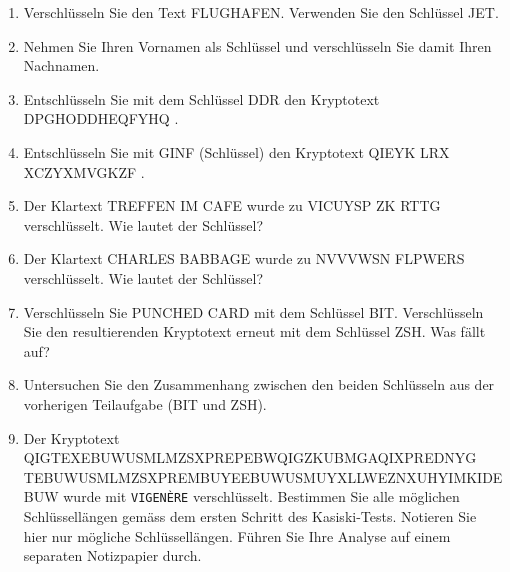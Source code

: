 \begin{enumerate}
\item Verschlüsseln Sie den Text FLUGHAFEN. Verwenden Sie den Schlüssel JET.

\fillwithgrid{0.75in}

\item Nehmen Sie Ihren Vornamen als Schlüssel und verschlüsseln Sie damit Ihren Nachnamen.

\fillwithgrid{0.75in}

\item Entschlüsseln Sie mit dem Schlüssel DDR den Kryptotext DPGHODDHEQFYHQ .


\fillwithgrid{1in}

\item Entschlüsseln Sie mit GINF (Schlüssel) den Kryptotext QIEYK LRX XCZYXMVGKZF .


\fillwithgrid{1in}

\item Der Klartext TREFFEN IM CAFE wurde zu VICUYSP ZK RTTG verschlüsselt. Wie lautet der Schlüssel?


\fillwithgrid{1in}

\item Der Klartext CHARLES BABBAGE wurde zu NVVVWSN FLPWERS verschlüsselt. Wie lautet der Schlüssel?



\newpage

\item Verschlüsseln Sie PUNCHED CARD mit dem Schlüssel BIT. Verschlüsseln Sie den resultierenden Kryptotext erneut mit dem Schlüssel ZSH. Was fällt auf?

\fillwithgrid{3in}

\item Untersuchen Sie den Zusammenhang zwischen den beiden Schlüsseln aus der vorherigen Teilaufgabe (BIT und ZSH).


\fillwithgrid{3in}

\item Der Kryptotext QIGTEXEBUWUSMLMZSXPREPEBWQIGZKUBMGAQIXPREDNYG TEBUWUSMLMZSXPREMBUYEEBUWUSMUYXLLWEZNXUHYIMKIDEBUW wurde mit \texttt{VIGENÈRE} verschlüsselt. Bestimmen Sie alle möglichen Schlüssellängen gemäss dem ersten Schritt des Kasiski-Tests. Notieren Sie hier nur mögliche Schlüssellängen. Führen Sie Ihre Analyse auf einem separaten Notizpapier durch.


\end{enumerate}
